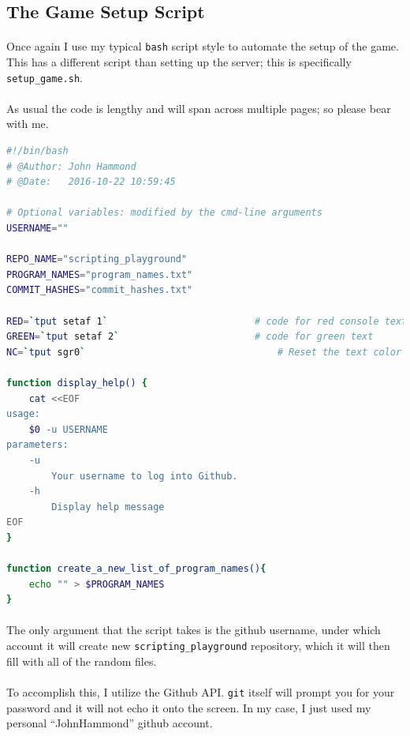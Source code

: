 \documentclass[11pt]{article}
\begin{document}
	\newpage

	\subsection{The Game Setup Script}

	\paragraph{} Once again I use my typical \texttt{bash} script style to automate the setup of the game. This has a different script than setting up the server; this is specifically \texttt{setup\_game.sh}.

	\paragraph{} As usual the code is lengthy and will span across multiple pages; so please bear with me.


	\begin{lstlisting}[language=bash]
#!/bin/bash
# @Author: John Hammond
# @Date:   2016-10-22 10:59:45

# Optional variables: modified by the cmd-line arguments
USERNAME=""

REPO_NAME="scripting_playground"
PROGRAM_NAMES="program_names.txt"
COMMIT_HASHES="commit_hashes.txt"

RED=`tput setaf 1`							# code for red console text
GREEN=`tput setaf 2`						# code for green text
NC=`tput sgr0`									# Reset the text color

function display_help() {
	cat <<EOF
usage:
	$0 -u USERNAME
parameters:
	-u
		Your username to log into Github.
	-h
		Display help message
EOF
}

function create_a_new_list_of_program_names(){
	echo "" > $PROGRAM_NAMES
}
	\end{lstlisting}

	\paragraph{} The only argument that the script takes is the github username, under which account it will create new \texttt{scripting\_playground} repository, which it will then fill with all of the random files.

	\paragraph{} To accomplish this, I utilize the Github API. \texttt{git} itself will prompt you for your password and it will not echo it onto the screen. In my case, I just used my personal ``JohnHammond'' github account.
\end{document}

